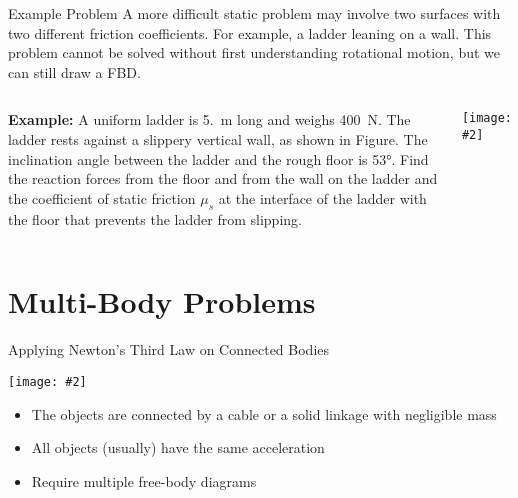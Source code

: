 \documentclass[12pt,compress,aspectratio=169]{beamer}
\newcommand{\pic}[2]{\texttt{[image: \#2]}}
\begin{document}
\begin{frame}{Example Problem}
  A more difficult static problem may involve two surfaces with two different
  friction coefficients. For example, a ladder leaning on a wall. This problem
  cannot be solved without first understanding rotational motion, but we can
  still draw a FBD.
  \vspace{.2in}
  \begin{columns}
    \textbf{Example:} A uniform ladder is \SI{5.}{\metre} long and weighs
    \SI{400}{\newton}. The ladder rests against a slippery vertical wall, as
    shown in Figure. The inclination angle between the ladder and the rough
    floor is \ang{53}. Find the reaction forces from the floor and
    from the wall on the ladder and the coefficient of static friction $\mu_s$
    at the interface of the ladder with the floor that prevents the ladder from
    slipping.

    \pic{1}{graphics/ladder}
  \end{columns}
\end{frame}



\section{Multi-Body Problems}

\begin{frame}{Applying Newton's Third Law on Connected Bodies}
  \begin{center}
    \pic{.7}{graphics/worldslongestroadtrainwithpowertrailer8}
  \end{center}
  \begin{itemize}
  \item The objects are connected by a cable or a solid linkage with negligible
    mass
  \item All objects (usually) have the same acceleration
  \item Require multiple free-body diagrams
  \end{itemize}
\end{frame}
\end{document}
